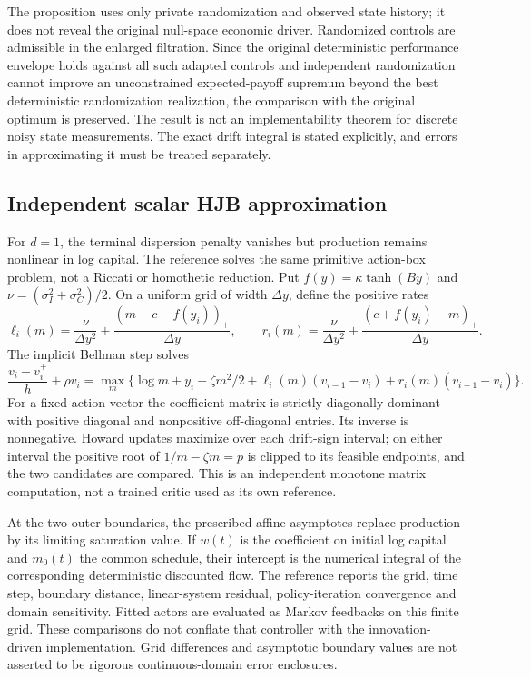 The proposition uses only private randomization and observed state history; it does not reveal the original null-space economic driver. Randomized controls are admissible in the enlarged filtration. Since the original deterministic performance envelope holds against all such adapted controls and independent randomization cannot improve an unconstrained expected-payoff supremum beyond the best deterministic randomization realization, the comparison with the original optimum is preserved. The result is not an implementability theorem for discrete noisy state measurements. The exact drift integral is stated explicitly, and errors in approximating it must be treated separately.

\subsection{Independent scalar HJB approximation}
For $d=1$, the terminal dispersion penalty vanishes but production remains nonlinear in log capital. The reference solves the same primitive action-box problem, not a Riccati or homothetic reduction. Put $f(y)=\kappa\tanh(By)$ and $\nu=(\sigma_I^2+\sigma_C^2)/2$. On a uniform grid of width $\Delta y$, define the positive rates
\[
 \ell_i(m)=\frac\nu{\Delta y^2}+\frac{(m-c-f(y_i))_+}{\Delta y},
 \qquad r_i(m)=\frac\nu{\Delta y^2}+\frac{(c+f(y_i)-m)_+}{\Delta y}.
\]
The implicit Bellman step solves
\[
 \frac{v_i-v_i^+}{h}+\rho v_i
 =\max_m\{\log m+y_i-\zeta m^2/2
       +\ell_i(m)(v_{i-1}-v_i)+r_i(m)(v_{i+1}-v_i)\}.
\]
For a fixed action vector the coefficient matrix is strictly diagonally dominant with positive diagonal and nonpositive off-diagonal entries. Its inverse is nonnegative. Howard updates maximize over each drift-sign interval; on either interval the positive root of $1/m-\zeta m=p$ is clipped to its feasible endpoints, and the two candidates are compared. This is an independent monotone matrix computation, not a trained critic used as its own reference.

At the two outer boundaries, the prescribed affine asymptotes replace production by its limiting saturation value. If $w(t)$ is the coefficient on initial log capital and $m_0(t)$ the common schedule, their intercept is the numerical integral of the corresponding deterministic discounted flow. The reference reports the grid, time step, boundary distance, linear-system residual, policy-iteration convergence and domain sensitivity. Fitted actors are evaluated as Markov feedbacks on this finite grid. These comparisons do not conflate that controller with the innovation-driven implementation. Grid differences and asymptotic boundary values are not asserted to be rigorous continuous-domain error enclosures.

